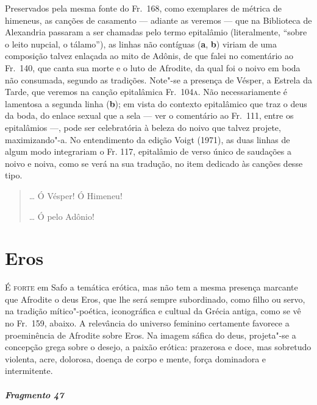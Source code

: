 {\small Preservados pela mesma fonte do Fr.~168, como exemplares de métrica de
himeneus, as canções de casamento --- adiante as veremos --- que na
Biblioteca de Alexandria passaram a ser chamadas pelo termo epitalâmio
(literalmente, ``sobre o leito nupcial, o tálamo''), as linhas não contíguas (\textbf{a}, \textbf{b}) viriam de uma composição talvez enlaçada ao mito de Adônis, de que falei no
comentário ao Fr.~140, que canta sua morte e o luto de Afrodite, da qual foi o noivo em boda não consumada, segundo as tradições. Note"-se
a presença de Vésper, a Estrela da Tarde, que veremos na canção
epitalâmica Fr.~104\textsc{a}. Não necessariamente é lamentosa a segunda linha
(\textbf{b}); em vista do contexto epitalâmico que traz o deus da boda, do
enlace sexual que a sela --- ver o comentário ao Fr.~111, entre os
epitalâmios ---, pode ser celebratória à beleza do noivo que talvez projete, maximizando"-a. No entendimento da edição Voigt (1971), as duas linhas de algum modo integrariam o Fr. 117, epitalâmio de verso único de saudações a noivo e noiva, como se verá na sua tradução, no item dedicado às canções desse tipo.}

\begin{verse}
\ldots{} Ó Vésper! Ó Himeneu!

\ast\quad\ast\quad\ast

\ldots{} Ó pelo Adônio!
\end{verse}



\chapter{Eros}

\textsc{É forte} em Safo a temática erótica, mas não tem a mesma presença marcante que
Afrodite o deus Eros, que lhe será sempre subordinado, como filho ou servo, na
tradição mítico"-poética, iconográfica e cultual da Grécia antiga, como se vê no
Fr.~159, abaixo. A relevância do universo feminino certamente favorece a
proeminência de Afrodite sobre Eros. Na imagem sáfica do deus, projeta"-se a
concepção grega sobre o desejo, a paixão erótica: prazerosa e doce, mas
sobretudo violenta, acre, dolorosa, doença de corpo e mente, força dominadora e
intermitente.

\paragraph{Fragmento 47}

